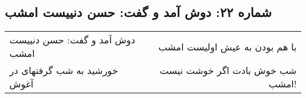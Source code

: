 \begin{center}
\section*{شماره ۲۲: دوش آمد و گفت: حسن دنییست امشب}
\label{sec:022}
\begin{longtable}{l p{0.5cm} r}
دوش آمد و گفت: حسن دنییست امشب
&&
با هم بودن به عیش اولیست امشب
\\
خورشید به شب گرفتهای در آغوش
&&
شب خوش بادت اگر خوشت نیست امشب!
\\
\end{longtable}
\end{center}

